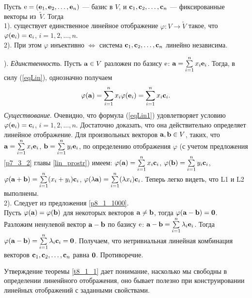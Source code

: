 \begin{theor}\label{t8_1_1}
Пусть $\mathrm{e} = (\mathbf{e}_1, \mathbf{e}_2, \ldots , \mathbf{e}_n)$ --- базис в $V$,
и $\mathbf{c}_1, \mathbf{c}_2, \ldots , \mathbf{c}_n$ --- фиксированные векторы из~$\widetilde{V}$. Тогда \\
1). существует единственное линейное отображение $\varphi :V\to \widetilde{V}$ такое, что
$\varphi(\mathbf{e}_i) = \mathbf{c}_i$, $i=1, 2, \ldots , n$. \\
2). При этом $\varphi$ инъективно $\Leftrightarrow$ система $\mathbf{c}_1, \mathbf{c}_2, \ldots , \mathbf{c}_n$ линейно независима.
\end{theor}
). {\it Единственность}. Пусть $\mathbf{a}\in V$ разложен по базису $\mathrm{e}$: $\mathbf{a}= \sum\limits_{i=1}^n x_i\mathbf{e}_i$.
Тогда, в силу (\ref{eqLin}), однозначно получаем 
\begin{equation}\label{eqLin1}
\varphi(\mathbf{a})= \sum\limits_{i=1}^n x_i\varphi (\mathbf{e}_i) = \sum\limits_{i=1}^n x_i \mathbf{c}_i.
\end{equation}
{\it Существование}. Очевидно, что формула (\ref{eqLin1}) удовлетворяет условию $\varphi(\mathbf{e}_i) = \mathbf{c}_i$, $i=1, 2, \ldots , n$.
Достаточно доказать, что она действительно определяет линейное отображение.
Для произвольных векторов $\mathbf{a}, \mathbf{b} \in V$, таких, что $\mathbf{a}= \sum\limits_{i=1}^n x_i\mathbf{e}_i$, $\mathbf{b}= \sum\limits_{i=1}^n y_i\mathbf{e}_i$,
по определению отображения $\varphi$ (с учетом предложения \ref{p7_3_2} главы \ref{lin_prostr}) имеем: 
$\varphi(\mathbf{a})= \sum\limits_{i=1}^n x_i \mathbf{c}_i$, 
$\varphi(\mathbf{b})=  \sum\limits_{i=1}^n y_i \mathbf{c}_i$,
$\varphi(\mathbf{a}+\mathbf{b})= \sum\limits_{i=1}^n (x_i+y_i) \mathbf{c}_i$, 
$\varphi(\lambda \mathbf{a})= \sum\limits_{i=1}^n (\lambda x_i) \mathbf{c}_i$.
Теперь легко видеть, что  L1 и L2 выполнены.\\
2). \dokright Следует из предложения \ref{p8_1_1000}.\\
\dokleft Пусть $\varphi (\mathbf{a}) = \varphi (\mathbf{b})$ для некоторых векторов $\mathbf{a}\neq \mathbf{b}$, тогда  
$\varphi (\mathbf{a}- \mathbf{b}) = \mathbf{0}$. Разложим ненулевой вектор $\mathbf{a}- \mathbf{b}$ по базису $\mathrm{e}$:
$\mathbf{a}- \mathbf{b} = \sum\limits_{i=1}^n \lambda_i \mathbf{e}_i$.
Тогда $\varphi (\mathbf{a}- \mathbf{b}) = \sum\limits_{i=1}^n \lambda_i \mathbf{c}_i = \mathbf{0}$. Получаем, что нетривиальная линейная
комбинация векторов $\mathbf{c}_1, \mathbf{c}_2, \ldots , \mathbf{c}_n$ равна $\mathbf{0}$. Противоречие.
\edok

\otstup

Утверждение теоремы \ref{t8_1_1} дает понимание, насколько мы свободны в определении линенйного отображения,
оно бывает полезно при конструировании линейных отображений с заданными свойствами.

